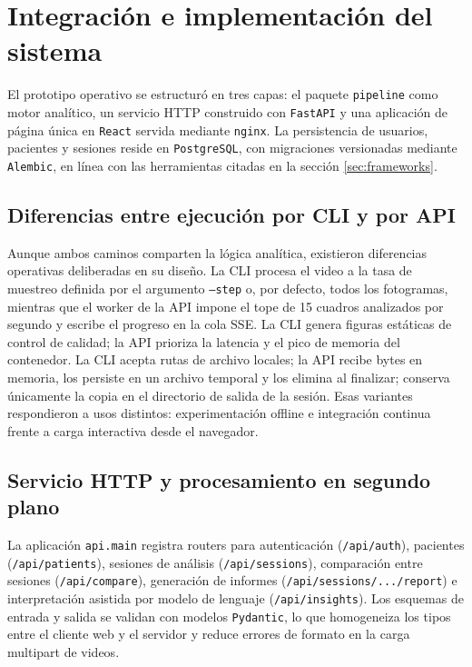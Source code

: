 
\section{Integración e implementación del sistema}
\label{sec:integracion}

El prototipo operativo se estructuró en tres capas: el paquete \texttt{pipeline} como motor analítico, un servicio HTTP construido con \texttt{FastAPI} y una aplicación de página única en \texttt{React} servida mediante \texttt{nginx}. La persistencia de usuarios, pacientes y sesiones reside en \texttt{PostgreSQL}, con migraciones versionadas mediante \texttt{Alembic}, en línea con las herramientas citadas en la sección \ref{sec:frameworks}.

\subsection{Diferencias entre ejecución por CLI y por API}

Aunque ambos caminos comparten la lógica analítica, existieron diferencias operativas deliberadas en su diseño. La CLI procesa el video a la tasa de muestreo definida por el argumento \texttt{--step} o, por defecto, todos los fotogramas, mientras que el worker de la API impone el tope de 15 cuadros analizados por segundo y escribe el progreso en la cola SSE. La CLI genera figuras estáticas de control de calidad; la API prioriza la latencia y el pico de memoria del contenedor. La CLI acepta rutas de archivo locales; la API recibe bytes en memoria, los persiste en un archivo temporal y los elimina al finalizar; conserva únicamente la copia en el directorio de salida de la sesión. Esas variantes respondieron a usos distintos: experimentación offline e integración continua frente a carga interactiva desde el navegador.

\subsection{Servicio HTTP y procesamiento en segundo plano}

\begin{sloppypar}
La aplicación \texttt{api.main} registra routers para autenticación (\texttt{/\allowbreak{}api/\allowbreak{}auth}), pacientes (\texttt{/\allowbreak{}api/\allowbreak{}patients}), sesiones de análisis (\texttt{/\allowbreak{}api/\allowbreak{}sessions}), comparación entre sesiones (\texttt{/\allowbreak{}api/\allowbreak{}compare}), generación de informes (\texttt{/\allowbreak{}api/\allowbreak{}sessions/\allowbreak{}.../\allowbreak{}report}) e interpretación asistida por modelo de lenguaje (\texttt{/\allowbreak{}api/\allowbreak{}insights}). Los esquemas de entrada y salida se validan con modelos \texttt{Pydantic}, lo que homogeneiza los tipos entre el cliente web y el servidor y reduce errores de formato en la carga multipart de videos.
\end{sloppypar}

